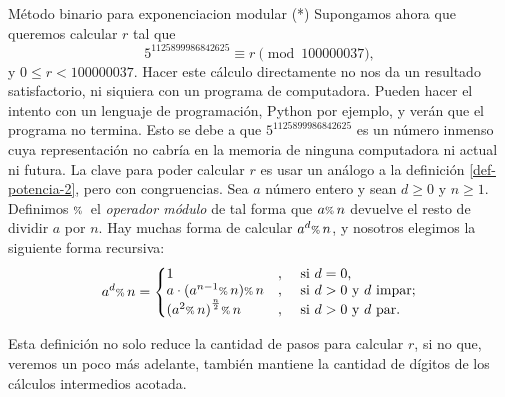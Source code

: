 \begin{section}{Método binario para exponenciacion modular (*)}
    Supongamos ahora que queremos calcular $r$ tal que  
$$
         5^{1125899986842625} \equiv r \pmod{100000037},
$$
 y $0 \le r < 100000037$. Hacer este cálculo  directamente no nos da un resultado satisfactorio, ni siquiera con un programa de computadora. Pueden hacer el intento con un lenguaje de programación, Python por ejemplo, y verán que el programa no termina. Esto se debe a que $5^{1125899986842625}$  es un número inmenso  cuya representación no cabría en la memoria de ninguna computadora ni actual ni futura. La clave  para poder calcular $r$ es usar un análogo a la definición \eqref{def-potencia-2}, pero con congruencias. Sea $a$ número entero y sean $d \ge 0$ y $n \ge 1$. Definimos ${\scriptstyle \%}\,$ el \textit{operador módulo} de tal forma que $a {\scriptstyle \%}\, n$ devuelve el resto de dividir $a$ por $n$. Hay muchas forma de calcular $a^d {\scriptstyle \%}\, n$, y nosotros elegimos  la siguiente forma recursiva:
 \begin{equation}\label{def-potencia-mod-1}
    a^d \modulo n = \left\{
    \begin{matrix*}[l]
        1&,&\text{ si $d = 0$,} \\
        a \cdot (a^{n-1} \modulo n) \modulo n &,&\text{  si $d > 0$ y  $d$ impar;} \\
        {(a^2 \modulo n)}^{\frac{n}{2}}\modulo n&,&\text{  si $d > 0$ y  $d$ par.}
    \end{matrix*}\right.   
\end{equation}

  Esta definición no solo reduce la cantidad de pasos para calcular $r$, si no que, veremos un poco más adelante, también mantiene la cantidad de dígitos de los cálculos intermedios acotada.


\end{section}

